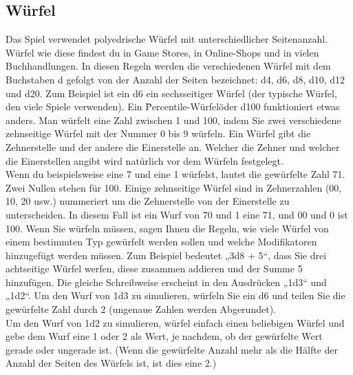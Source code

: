 \subsection{Würfel}
Das Spiel verwendet polyedrische Würfel mit unterschiedlicher Seitenanzahl. Würfel wie diese findest du in Game Stores, in Online-Shops und in vielen Buchhandlungen. In diesen Regeln werden die verschiedenen Würfel mit dem Buchstaben d gefolgt von der Anzahl der Seiten bezeichnet: d4, d6, d8, d10, d12 und d20. Zum Beispiel ist ein d6 ein sechsseitiger Würfel (der typische Würfel, den viele Spiele verwenden). Ein \"Percentile-Würfel\" oder d100 funktioniert etwas anders. Man würfelt eine Zahl zwischen 1 und 100, indem Sie zwei verschiedene zehnseitige Würfel mit der Nummer 0 bis 9 würfeln. Ein Würfel gibt die Zehnerstelle und der andere die Einerstelle an. Welcher die Zehner und welcher die Einerstellen angibt wird natürlich vor dem Würfeln festgelegt. \\
Wenn du beispielsweise eine 7 und eine 1 würfelst, lautet die gewürfelte Zahl 71. Zwei Nullen stehen für 100. Einige zehnseitige Würfel sind in Zehnerzahlen (00, 10, 20 usw.) nummeriert um die Zehnerstelle von der Einerstelle zu unterscheiden. In diesem Fall ist ein Wurf von 70 und 1 eine 71, und 00 und 0 ist 100. Wenn Sie würfeln müssen, sagen Ihnen die Regeln, wie viele Würfel von einem bestimmten Typ gewürfelt werden sollen und welche Modifikatoren hinzugefügt werden müssen. Zum Beispiel bedeutet „3d8 + 5“, dass Sie drei achtseitige Würfel werfen, diese zusammen addieren und der Summe 5 hinzufügen. Die gleiche Schreibweise erscheint in den Ausdrücken „1d3“ und „1d2“. Um den Wurf von 1d3 zu simulieren, würfeln Sie ein d6 und teilen Sie die gewürfelte Zahl durch 2 (ungenaue Zahlen werden Abgerundet).\\
Um den Wurf von 1d2 zu simulieren, würfel einfach einen beliebigen Würfel und gebe dem Wurf eine 1 oder 2 als Wert, je nachdem, ob der gewürfelte Wert gerade oder ungerade ist. (Wenn die gewürfelte Anzahl mehr als die Hälfte der Anzahl der Seiten des Würfels ist, ist dies eine 2.)

